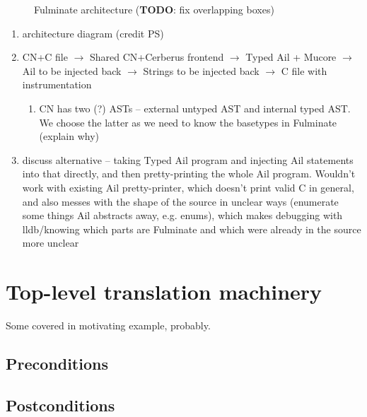 \documentclass[withindex,glossary]{cam-thesis}
\begin{document}
\begin{figure}
\caption{Fulminate architecture (\textbf{TODO}: fix overlapping boxes)}\label{fig:fulm}
\end{figure}

\begin{enumerate}
  \item architecture diagram (credit PS)
  \item CN+C file $\rightarrow$ Shared CN+Cerberus frontend $\rightarrow$ Typed Ail + Mucore $\rightarrow$ Ail to be injected back $\rightarrow$ Strings to be injected back $\rightarrow$ C file with instrumentation
  \begin{enumerate}
    \item CN has two (?) ASTs -- external untyped AST and internal typed AST. We choose the latter as we need to know the basetypes in Fulminate (explain why)
  \end{enumerate}
  \item discuss alternative -- taking Typed Ail program and injecting Ail statements into that directly, and then pretty-printing the whole Ail program. Wouldn't work with existing Ail pretty-printer, which doesn't print valid C in general, and also messes with the shape of the source in unclear ways (enumerate some things Ail abstracts away, e.g. enums), which makes debugging with lldb/knowing which parts are Fulminate and which were already in the source more unclear
\end{enumerate}

\section{Top-level translation machinery}\label{sec:top-level-translation}

Some covered in motivating example, probably.

\subsection{Preconditions}
\subsection{Postconditions}
\end{document}
